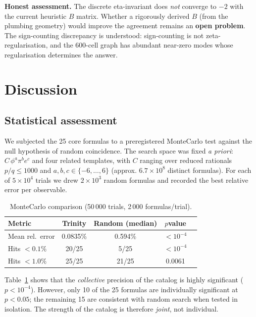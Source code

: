 \documentclass[11pt,a4paper]{article}
\theoremstyle{definition}
\begin{document}
\textbf{Honest assessment.} The discrete eta-invariant does \emph{not}
converge to $-2$ with the current heuristic $B$ matrix. Whether a
rigorously derived $B$ (from the plumbing geometry) would improve the
agreement remains an \textbf{open problem}. The sign-counting discrepancy
is understood: sign-counting is not zeta-regularisation, and the 600-cell
graph has abundant near-zero modes whose regularisation determines the
answer.

\section{Discussion}\label{sec:discussion}

\subsection{Statistical assessment}\label{sec:stats}

We subjected the 25 core formulas to a pre\-registered Monte\-Carlo test
against the null hypothesis of random coincidence.  The search space
was fixed \emph{a priori}: $C\,\phi^a\pi^b e^c$ and four related templates,
with $C$ ranging over reduced rationals $p/q\le 1000$ and
$a,b,c\in\{-6,\dots,6\}$ (approx. $6.7\times10^8$ distinct formulas).
For each of $5\times10^4$ trials we drew $2\times10^3$ random formulas
and recorded the best relative error per observable.

\begin{table}[h]
\centering
\begin{tabular}{lcccc}
\hline
Metric & Trinity & Random (median) & $p$\-value \\
\hline
Mean rel.\ error & 0.0835\% & 0.594\% & $<10^{-4}$ \\
Hits $<0.1\%$ & 20/25 & 5/25 & $<10^{-4}$ \\
Hits $<1.0\%$ & 25/25 & 21/25 & 0.0061 \\
\hline
\end{tabular}
\caption{Monte\-Carlo comparison (50\,000 trials, 2\,000 formulas/trial).}
\label{tab:mc}
\end{table}

Table~\ref{tab:mc} shows that the \emph{collective} precision of the
catalog is highly significant ($p<10^{-4}$).  However, only 10 of the
25 formulas are individually significant at $p<0.05$; the remaining 15
are consistent with random search when tested in isolation.  The
strength of the catalog is therefore \emph{joint}, not individual.
\end{document}
